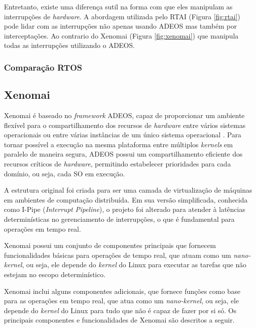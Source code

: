 \documentclass[conference]{IEEEtran}
\begin{document}
Entretanto, existe uma diferença sutil na forma com que eles manipulam as interrupções de \textit{hardware}. A abordagem utilizada pelo RTAI (Figura \ref{fig:rtai}) pode lidar com as interrupções não apenas usando ADEOS mas também por interceptações. Ao contrario do Xenomai (Figura \ref{fig:xenomai}) que manipula todas as interrupções utilizando o ADEOS.

\subsubsection{Comparação RTOS}

\subsection{Xenomai}\label{subsec:xenomai}

Xenomai é baseado no \textit{framework} ADEOS, capaz de proporcionar um ambiente flexível para o compartilhamento dos recursos de \textit{hardware} entre vários sistemas operacionais ou entre várias instâncias de um único sistema operacional \cite{ADEOS}. Para tornar possível a execução na mesma plataforma entre múltiplos \textit{kernels} em paralelo de maneira segura, ADEOS possui um compartilhamento eficiente dos recursos críticos de \textit{hardware}, permitindo estabelecer prioridades para cada domínio, ou seja, cada SO em execução. 

A estrutura original foi criada para ser uma camada de virtualização de máquinas em ambientes de computação distribuída. Em sua versão simplificada, conhecida como I-Pipe (\textit{Interrupt Pipeline}), o projeto foi alterado para atender à latências determinísticas no gerenciamento de interrupções, o que é fundamental para operações em tempo real.

Xenomai possui um conjunto de componentes principais que fornecem funcionalidades básicas para operações de tempo real, que atuam como um \textit{nano-kernel}, ou seja, ele depende do \textit{kernel} do Linux para executar as tarefas que não estejam no escopo determinístico.

Xenomai inclui alguns componentes adicionais, que fornece funções como base para as operações em tempo real, que atua como um \textit{nano-kernel}, ou seja, ele depende do \textit{kernel} do Linux para tudo que não é capaz de fazer por si só. Os principais componentes e funcionalidades de Xenomai são descritos a seguir.
\end{document}
